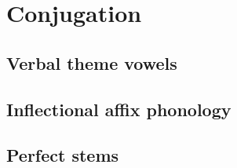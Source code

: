 \chapter{Conjugation}

\section{Verbal theme vowels}

\section{Inflectional affix phonology}

\section{Perfect stems}
